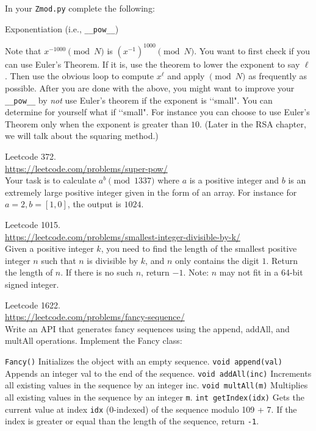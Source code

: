 \begin{ex}
  In your \verb!Zmod.py! complete the following:
  \begin{enumerate}[nosep]
    \li Exponentiation (i.e., \verb!__pow__!)
  \end{enumerate}
  Note that $x^{-1000} \pmod{N}$ is $(x^{-1})^{1000} \pmod{N}$.
  You want to first check if you can use Euler's Theorem.
  If it is, use the theorem to lower the exponent to say $\ell$.
  Then use the obvious loop to compute $x^\ell$ and apply $\pmod{N}$
  as frequently as possible.
  After you are done with the above,
  you might want to improve your \texttt{\_\_pow\_\_} by
  \textit{not} use Euler's theorem
  if the exponent is \lq\lq small".
  You can determine for yourself what if \lq\lq small".
  For instance you can choose to use Euler's Theorem
  only when the exponent is greater than $10$.
  (Later in the RSA chapter, we will talk about the squaring method.)
\end{ex}

\begin{ex}
  Leetcode 372.\\
  \url{https://leetcode.com/problems/super-pow/} \\
  Your task is to calculate $a^b \pmod{1337}$ where $a$ is a positive integer
  and $b$ is an extremely large positive integer given in the form of an array.
  For instance
  for $a = 2, b = [1,0]$,
  the output is $1024$.
\end{ex}

\begin{ex}
  Leetcode 1015.\\
  \url{https://leetcode.com/problems/smallest-integer-divisible-by-k/}\\
  Given a positive integer $k$, you need to find the length of the smallest positive integer
  $n$ such that $n$ is divisible by $k$, and $n$ only contains the digit $1$.
  Return the length of $n$. If there is no such $n$, return $-1$.
  Note: $n$ may not fit in a 64-bit signed integer.
\end{ex}

\begin{ex}
  Leetcode 1622.\\
  \url{https://leetcode.com/problems/fancy-sequence/}\\
  Write an API that generates fancy sequences using the append, addAll, and multAll operations.
  Implement the Fancy class:
  \begin{enumerate}[nosep]
    \li \verb!Fancy()! Initializes the object with an empty sequence.
    \li \verb!void append(val)! Appends an integer val to the end of the sequence.
    \li \verb!void addAll(inc)! Increments all existing values in the sequence by an integer inc.
    \li \verb!void multAll(m)! Multiplies all existing values in the sequence by an integer \verb!m!.
    \li \verb!int getIndex(idx)! Gets the current value at index \verb!idx! (0-indexed)
    of the sequence modulo 109 + 7.
    If the index is greater or equal than the length of the sequence, return \verb!-1!.
  \end{enumerate}
\end{ex}

